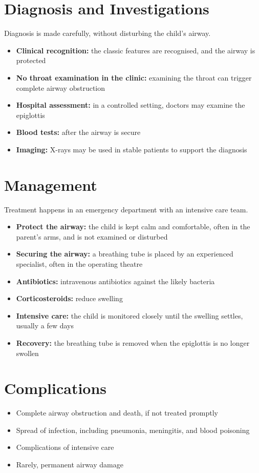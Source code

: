\section*{Diagnosis and Investigations}
Diagnosis is made carefully, without disturbing the child's airway.
\begin{itemize}
    \item \textbf{Clinical recognition:} the classic features are recognised, and the airway is protected
    \item \textbf{No throat examination in the clinic:} examining the throat can trigger complete airway obstruction
    \item \textbf{Hospital assessment:} in a controlled setting, doctors may examine the epiglottis
    \item \textbf{Blood tests:} after the airway is secure
    \item \textbf{Imaging:} X-rays may be used in stable patients to support the diagnosis
\end{itemize}

\section*{Management}
Treatment happens in an emergency department with an intensive care team.
\begin{itemize}
    \item \textbf{Protect the airway:} the child is kept calm and comfortable, often in the parent's arms, and is not examined or disturbed
    \item \textbf{Securing the airway:} a breathing tube is placed by an experienced specialist, often in the operating theatre
    \item \textbf{Antibiotics:} intravenous antibiotics against the likely bacteria
    \item \textbf{Corticosteroids:} reduce swelling
    \item \textbf{Intensive care:} the child is monitored closely until the swelling settles, usually a few days
    \item \textbf{Recovery:} the breathing tube is removed when the epiglottis is no longer swollen
\end{itemize}

\section*{Complications}
\begin{itemize}
    \item Complete airway obstruction and death, if not treated promptly
    \item Spread of infection, including pneumonia, meningitis, and blood poisoning
    \item Complications of intensive care
    \item Rarely, permanent airway damage
\end{itemize}

